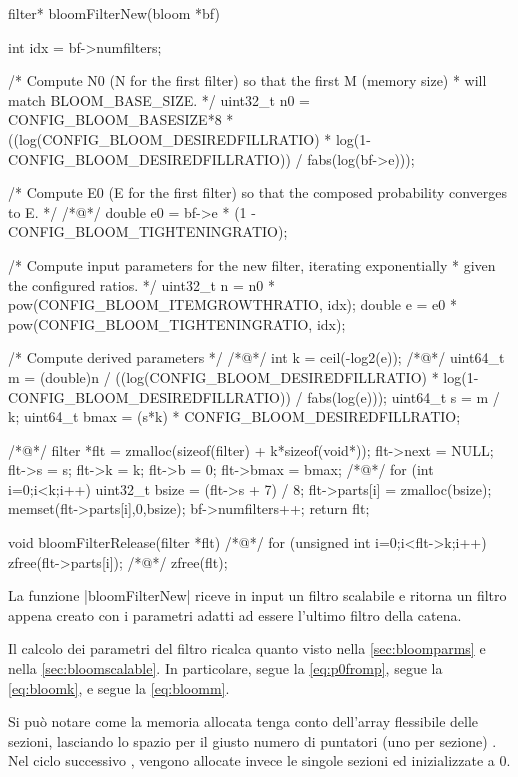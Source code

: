 \begin{commentedsource}[style=csource,caption=Creazione e distruzione di un filtro,label={lst:bloomFilterNew}]
filter* bloomFilterNew(bloom *bf) {
    int idx = bf->numfilters;

    /* Compute N0 (N for the first filter) so that the first M (memory size)
     * will match BLOOM_BASE_SIZE. */
    uint32_t n0 = CONFIG_BLOOM_BASESIZE*8 * ((log(CONFIG_BLOOM_DESIREDFILLRATIO) * log(1-CONFIG_BLOOM_DESIREDFILLRATIO)) / fabs(log(bf->e)));

    /* Compute E0 (E for the first filter) so that the composed probability converges to E. */
/*@\lnote@*/    double e0 = bf->e * (1 - CONFIG_BLOOM_TIGHTENINGRATIO);

    /* Compute input parameters for the new filter, iterating exponentially
     * given the configured ratios. */
    uint32_t n = n0 * pow(CONFIG_BLOOM_ITEMGROWTHRATIO, idx);
    double e = e0 * pow(CONFIG_BLOOM_TIGHTENINGRATIO, idx);

    /* Compute derived parameters */
/*@\lnote@*/    int k = ceil(-log2(e));
/*@\lnote@*/    uint64_t m = (double)n / ((log(CONFIG_BLOOM_DESIREDFILLRATIO) * log(1-CONFIG_BLOOM_DESIREDFILLRATIO)) / fabs(log(e)));
    uint64_t s = m / k;
    uint64_t bmax = (s*k) * CONFIG_BLOOM_DESIREDFILLRATIO;

/*@\lnote@*/    filter *flt = zmalloc(sizeof(filter) + k*sizeof(void*));
    flt->next = NULL;
    flt->s = s;
    flt->k = k;
    flt->b = 0;
    flt->bmax = bmax;
/*@\lnote@*/    for (int i=0;i<k;i++) {
        uint32_t bsize = (flt->s + 7) / 8;
        flt->parts[i] = zmalloc(bsize);
        memset(flt->parts[i],0,bsize);
    }
    bf->numfilters++;
    return flt;
}

void bloomFilterRelease(filter *flt) {
/*@\lnote@*/    for (unsigned int i=0;i<flt->k;i++)
        zfree(flt->parts[i]);
/*@\lnote@*/    zfree(flt);
}
\end{commentedsource}

La funzione \cverb|bloomFilterNew| riceve in input un filtro scalabile e ritorna un filtro appena
creato con i parametri adatti ad essere l'ultimo filtro della catena.

Il calcolo dei parametri del filtro ricalca quanto visto nella \autoref{sec:bloomparms} e nella
\autoref{sec:bloomscalable}. In particolare,  segue la \autoref{eq:p0fromp},  
segue la \autoref{eq:bloomk}, e  segue la \autoref{eq:bloomm}.

Si può notare come la memoria allocata tenga conto dell'array flessibile delle sezioni, lasciando lo
spazio per il giusto numero di puntatori (uno per sezione) . Nel ciclo successivo
, vengono allocate invece le singole sezioni ed inizializzate a $0$.

